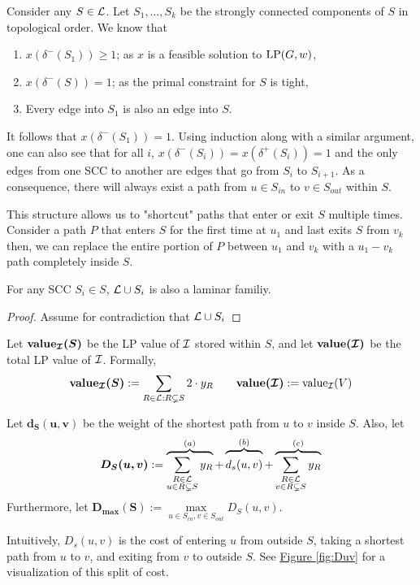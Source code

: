 
	Consider any $S\in \mathcal{L}$. Let $S_1,\dots, S_k$ be the strongly connected components of $S$ in topological order.
	We know that
	\begin{enumerate}
		\item $x(\delta^-(S_1)) \geq 1$; as $x$ is a feasible solution to $\textup{LP}(G,w)$,
		\item $x(\delta^-(S)) = 1$; as the primal constraint for $S$ is tight,
		\item Every edge into $S_1$ is also an edge into $S$.
	\end{enumerate}
	It follows that $x(\delta^-(S_1)) = 1$.
	Using induction along with a similar argument, one can also see that for all $i$, $x(\delta^-(S_i)) = x(\delta^+(S_i)) = 1$ and the only edges from one SCC to another are edges that go from $S_i$ to $S_{i + 1}$.
	As a consequence, there will always exist a path from $u\in S_{in}$ to $v\in S_{out}$ within $S$.

	This structure allows us to "shortcut" paths that enter or exit $S$ multiple times. Consider a path $P$ that enters $S$ for the first time at $u_1$ and last exits $S$ from $v_k$ then, we can replace the entire portion of $P$ between $u_1$ and $v_k$ with a $u_1 - v_k$ path completely inside $S$.\\
	
	\begin{lemma}\label{lemm:2:SiAgree}
		For any SCC $S_i \in S$, $\mathcal{L} \cup S_i$ is also a laminar familiy.
	\end{lemma}
	\begin{proof}
		Assume for contradiction that $\mathcal{L} \cup S_i$ 
	\end{proof}
	
	\begin{definition}\label{def:value}
		Let $\bm{\textbf{\textup{value}}_{\mathcal{I}}(S)}$ be the LP value of $\mathcal{I}$ stored within $S$, and let $\bm{\textbf{\textup{value}}(\mathcal{I})}$ be the total LP value of $\mathcal{I}$. Formally,
		\[
			\bm{\textbf{\textup{value}}_{\mathcal{I}}(S)}:=\sum\limits_{R\in \mathcal{L}:R\subsetneq S}2\cdot y_R\qquad \bm{\textbf{\textup{value}}(\mathcal{I})}:=\textup{value}_{\mathcal{I}}(V)
		\]
	\end{definition}

	\begin{definition}
		Let $\bm{d_S(u,v)}$ be the weight of the shortest path from $u$ to $v$ inside $S$. Also, let
		\begin{equation}
			\bm{D_S(u,v)}:=\overbrace{\sum_{\substack{R\in \lam \\ u\in R\subsetneq S}}y_R}^{(a)} + \overbrace{\rule{0pt}{4mm}d_s(u,v)}^{(b)} + \overbrace{\sum_{\substack{R\in \lam \\ v\in R\subsetneq S}}y_R}^{(c)}\label{def:1}
		\end{equation}
		Furthermore, let $\bm{D_{\max}(S)} := \max\limits_{u \in S_{in}, v \in S_{out}}D_S(u,v)$.

		Intuitively, $D_s(u,v)$ is the cost of entering $u$ from outside $S$, taking a shortest path from $u$ to $v$, and exiting from $v$ to outside $S$. See \hyperref[fig:Duv]{Figure \ref{fig:Duv}} for a visualization of this split of cost.\\
	\end{definition}
	

